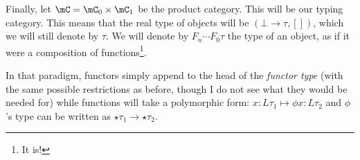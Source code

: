 \documentclass[math, english, info]{cours}
\begin{document}
Finally, let $\mC = \mC_{0} \times \mC_{1}$ be the product category. This will be our typing category.
This means that the real type of objects will be $\left( \bot \to \tau, [] \right)$, which we will still denote by $\tau$.
We will denote by $F_{n} \cdots F_{0} \tau$ the type of an object, as if it were a composition of functions\footnote{It is!}.

In that paradigm, functors simply append to the head of the \emph{functor type} (with the same possible restrictions as before, though I do not see what they would be needed for) while functions will take a polymorphic form:
$x: L\tau_{1} \mapsto \phi x: L\tau_{2}$ and $\phi$'s type can be written as $\star\tau_{1} \to \star\tau_{2}$.



\end{document}
